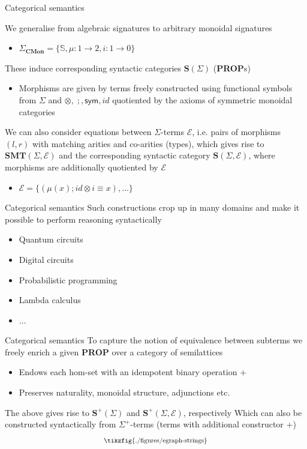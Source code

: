 \documentclass[aspectratio=169]{beamer}
\begin{document}
\begin{frame}{Categorical semantics}

We generalise from \alert{algebraic} signatures to arbitrary \alert{monoidal signatures}
\begin{itemize}
    \item $\Sigma_{\mathbf{CMon}} = \{\mathbb{S},\mu : 1 \to 2, i : 1 \to 0\}$
\end{itemize}
These induce corresponding syntactic categories $\mathbf{S}(\Sigma)$ (\textbf{PROP}s)
\begin{itemize}
    \item Morphisms are given by terms freely constructed using functional symbols from $\Sigma$ and $\otimes,\; ;, \textsf{sym}, id$ quotiented by the axioms of symmetric monoidal categories
\end{itemize}

We can also consider equations between $\Sigma$-terms $\mathcal{E}$, i.e. pairs of morphisms $(l,r)$ with matching arities and co-arities (types), which gives rise to $\mathbf{SMT}(\Sigma,\mathcal{E})$ and the corresponding syntactic category $\mathbf{S}(\Sigma, \mathcal{E})$, where morphisms are additionally quotiented by $\mathcal{E}$
\begin{itemize}
    \item $\mathcal{E} = \{(\mu(x);id \otimes i \equiv x), \ldots\}$
\end{itemize}

\end{frame}

\begin{frame}{Categorical semantics}
Such constructions crop up in many domains and make it possible to perform reasoning syntactically
\begin{itemize}
    \item Quantum circuits
    \item Digital circuits
    \item Probabilistic programming
    \item Lambda calculus
    \item $\ldots$
\end{itemize}
\end{frame}

\begin{frame}{Categorical semantics}
To capture the notion of equivalence between subterms we freely enrich a given \textbf{PROP} over a category of semilattices
\begin{itemize}
\item Endows each hom-set with an idempotent binary operation $+$
\item Preserves naturality, monoidal structure, adjunctions etc. 
\end{itemize}
\vfill
\pause
The above gives rise to $\mathbf{S}^{+}(\Sigma)$ and $\mathbf{S}^{+}(\Sigma,\mathcal{E})$, respectively
\vfill
\pause
\vfill
Which can also be constructed syntactically from $\Sigma^{+}$-terms (terms with additional constructor $+$)
\[
\scalebox{0.8}{
\tikzfig{./figures/egraph-strings}
}
\]

\end{frame}
\end{document}
